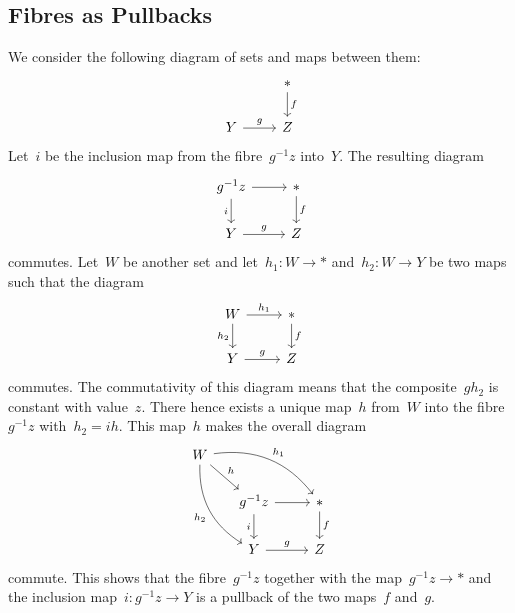 \subsection{Fibres as Pullbacks}

We consider the following diagram of sets and maps between them:
\[
	\begin{tikzcd}
		{}
		&
		\ast
		\arrow{d}[right]{f}
		\\
		Y
		\arrow{r}[above]{g}
		&
		Z
	\end{tikzcd}
\]
Let~$i$ be the inclusion map from the fibre~$g^{-1} z$ into~$Y$.
The resulting diagram
\[
	\begin{tikzcd}
		g^{-1} z
		\arrow{r}
		\arrow{d}[left]{i}
		&
		\ast
		\arrow{d}[right]{f}
		\\
		Y
		\arrow{r}[above]{g}
		&
		Z
	\end{tikzcd}
\]
commutes.
Let~$W$ be another set and let~$h_1 \colon W \to \ast$ and~$h_2 \colon W \to Y$ be two maps such that the diagram
\[
	\begin{tikzcd}
		W
		\arrow{r}[above]{h_1}
		\arrow{d}[left]{h_2}
		&
		\ast
		\arrow{d}[right]{f}
		\\
		Y
		\arrow{r}[above]{g}
		&
		Z
	\end{tikzcd}
\]
commutes.
The commutativity of this diagram means that the composite~$g h_2$ is constant with value~$z$.
There hence exists a unique map~$h$ from~$W$ into the fibre~$g^{-1} z$ with~$h_2 = i h$.
This map~$h$ makes the overall diagram
\[
	\begin{tikzcd}
		W
		\arrow[bend left]{drr}[above right]{h_1}
		\arrow[bend right]{ddr}[below left]{h_2}
		\arrow{dr}[above right]{h}
		&[-1em]
		{}
		&
		{}
		\\
		{}
		&
		g^{-1} z
		\arrow{r}
		\arrow{d}[left]{i}
		&
		\ast
		\arrow{d}[right]{f}
		\\
		{}
		&
		Y
		\arrow{r}[above]{g}
		&
		Z
	\end{tikzcd}
\]
commute.
This shows that the fibre~$g^{-1} z$ together with the map~$g^{-1} z \to \ast$ and the inclusion map~$i \colon g^{-1} z \to Y$ is a pullback of the two maps~$f$ and~$g$.
